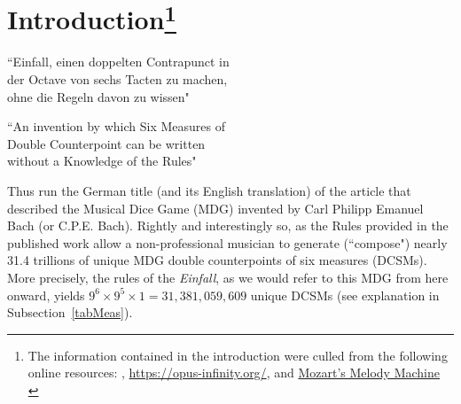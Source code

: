 \documentclass[a4paper,x11names,svgnames,10pt]{article}
\begin{document}
{\section[Introduction]{Introduction\footnote{The information contained in the introduction were culled from the following online resources:
	\citet{wiki_mw2017},
	\url{https://opus-infinity.org/}, and 
	\href{https://www.sciencenews.org/article/mozarts-melody-machine-0}{Mozart's Melody Machine} \citep*{peterson2001}
	}
}
	\begin{center}
	\begin{minipage}{0.4\textwidth}
	\begin{flushleft}
		\begin{center}
			``\small Einfall, einen doppelten Contrapunct in \\
			der Octave von sechs Tacten zu machen, \\
			ohne die Regeln davon zu wissen"
		\end{center}
	\end{flushleft}
	\end{minipage}
	\begin{minipage}{0.4\textwidth}
	\begin{flushright}
		\begin{center}
		``\small An invention by which Six Measures of \\
		Double Counterpoint can be written \\
		without a Knowledge of the Rules"
	\end{center}
	\end{flushright}
	\end{minipage}
	\end{center}

Thus run the German title (and its English translation) of the article that described the Musical Dice Game (MDG) invented by Carl Philipp Emanuel Bach (or C.P.E. Bach).  Rightly and interestingly so, as the Rules provided in the published work allow a non-professional musician to generate (``compose") nearly 31.4 trillions of unique MDG double counterpoints of six measures (DCSMs).  More precisely, the rules of the {\it Einfall}, as we would refer to this MDG from here onward, yields $9^6 \times 9^5 \times 1 = 31,\!381,\!059,\!609$ unique DCSMs (see explanation in Subsection~\ref{tabMeas}).\\  %

}
\end{document}
